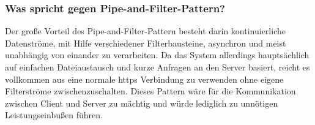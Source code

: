 \subsubsection{Was spricht gegen Pipe-and-Filter-Pattern?}
Der große Vorteil des Pipe-and-Filter-Pattern besteht darin kontinuierliche Datenströme, mit Hilfe verschiedener Filterbausteine, asynchron und meist unabhängig von einander zu verarbeiten. Da das System allerdings hauptsächlich auf einfachen Dateiaustausch und kurze Anfragen an den Server basiert, reicht es vollkommen aus eine normale https Verbindung zu verwenden ohne eigene Filterströme zwischenzuschalten. Dieses Pattern wäre für die Kommunikation zwischen Client und Server zu mächtig und würde lediglich zu unnötigen Leistungseinbußen führen.